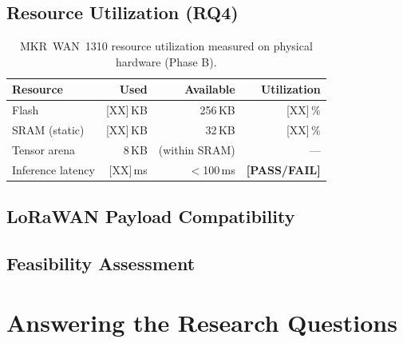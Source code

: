 \documentclass[12pt, a4paper, twoside, openright]{report}
\begin{document}
\subsection{Resource Utilization (RQ4)}

\begin{table}[H]
  \centering
  \begin{tabular}{lrrr}
    \toprule
    \textbf{Resource} & \textbf{Used} & \textbf{Available} &
    \textbf{Utilization} \\
    \midrule
    Flash               & [XX]\,KB & 256\,KB       & [XX]\,\%             \\
    SRAM (static)       & [XX]\,KB & 32\,KB        & [XX]\,\%             \\
    Tensor arena        & 8\,KB    & (within SRAM) & ---                  \\
    Inference latency   & [XX]\,ms & ${<}$100\,ms  & \textbf{[PASS/FAIL]} \\
    \bottomrule
  \end{tabular}
  \caption{MKR~WAN~1310 resource utilization measured on physical hardware
    (Phase B).}
  \label{tab:hw-resources}
\end{table}

\subsection{LoRaWAN Payload Compatibility}

\subsection{Feasibility Assessment}



\section{Answering the Research Questions}
\end{document}
